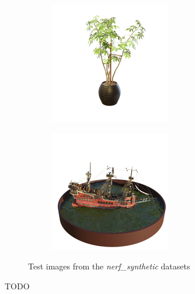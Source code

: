 \documentclass{article}
\begin{document}
\begin{figure}[!h]
\begin{subfigure}{.24\textwidth}
\end{subfigure}
\begin{subfigure}{.24\textwidth}
  \centering
  \includegraphics[width=\linewidth]{figs/results/ficus_ref.png}  
\end{subfigure}
\begin{subfigure}{.24\textwidth}
  \centering
  \includegraphics[width=\linewidth]{figs/results/ship_ref.png}  
\end{subfigure}

     \caption{Test images from the \textit{nerf\_synthetic} datasets}
    \label{fig:dataset}
\end{figure}
TODO
\end{document}
